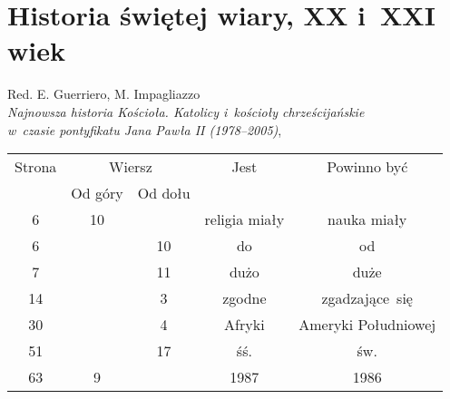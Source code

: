 \documentclass[a4paper,11pt]{article}
\numberwithin{equation}{section}
\begin{document}
\section{Historia świętej wiary, XX i~XXI wiek}



{ %
  Red. E. Guerriero, M. Impagliazzo \\
  \textit{Najnowsza historia Kościoła. Katolicy i~kościoły
    chrześcijańskie} \\
  \textit{w~czasie pontyfikatu Jana Pawła II (1978--2005)},
  \cite{GuerrieroImpagliazzoNajnowszaHistoriaKosciola2006} }

\vspace{0em}




\begin{center}

  \begin{tabular}{|c|c|c|c|c|}
    \hline
    Strona & \multicolumn{2}{c|}{Wiersz} & Jest
                              & Powinno być \\ \cline{2-3}
    & Od góry & Od dołu & & \\
    \hline
    \hphantom{0}6 & 10 & & religia miały & nauka miały \\
    \hphantom{0}6 & & 10 & do & od \\
    \hphantom{0}7 & & 11 & dużo & duże \\
    14 & & \hphantom{0}3 & zgodne & zgadzające~się \\
    30 & & \hphantom{0}4 & Afryki & Ameryki Południowej \\
    51 & & 17 & śś. & św. \\
    63 & \hphantom{0}9 & & 1987 & 1986 \\
    \hline
  \end{tabular}

\end{center}













\end{document}
